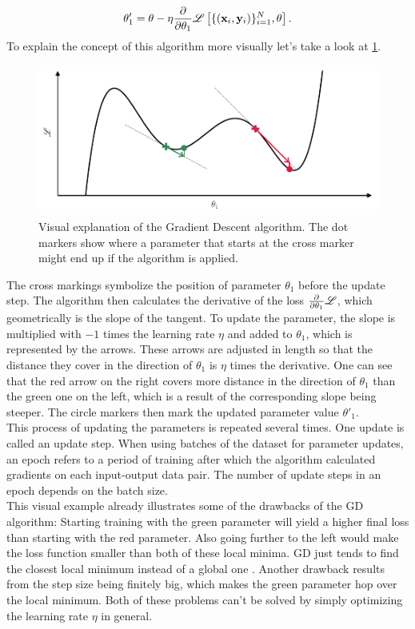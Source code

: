 \begin{equation}
	\theta_1' = \theta - \eta \frac{\partial}{\partial\theta_1} \mathscr{L}\left[ \{(\mathbf{x}_i, \mathbf{y}_i)\}_{i=1}^{N}, \theta \right].
\end{equation}
To explain the concept of this algorithm more visually let's take a look at \cref{fig:gd_explanation_plot}. 
\begin{figure}
	\centering
	\includegraphics[width = \textwidth]{text/MachineLearningBasics/plots/sgd_plot.pdf}
	\caption{Visual explanation of the Gradient Descent algorithm. The dot markers show where a parameter that starts at the cross marker might end up if the algorithm is applied.}
	\label{fig:gd_explanation_plot}
\end{figure}
The cross markings symbolize the position of parameter $\theta_1$ before the update step. The algorithm then calculates the derivative of the loss $\frac{\partial}{\partial\theta_1} \mathscr{L}$, which geometrically is the slope of the tangent. To update the parameter, the slope is multiplied with $-1$ times the learning rate $\eta$ and added to $\theta_1$, which is represented by the arrows. These arrows are adjusted in length so that the distance they cover in the direction of $\theta_1$ is $\eta$ times the derivative. One can see that the red arrow on the right covers more distance in the direction of $\theta_1$ than the green one on the left, which is a result of the corresponding slope being steeper. The circle markers then mark the updated parameter value $\theta'_1$.\\
This process of updating the parameters is repeated several times. One update is called an update step. When using batches of the dataset for parameter updates, an epoch refers to a period of training after which the algorithm calculated gradients on each input-output data pair. The number of update steps in an epoch depends on the batch size.\\ 
This visual example already illustrates some of the drawbacks of the GD algorithm: Starting training with the green parameter will yield a higher final loss than starting with the red parameter. Also going further to the left would make the loss function smaller than both of these local minima. GD just tends to find the closest local minimum instead of a global one \cite{SGDLocalMinima}. Another drawback results from the step size being finitely big, which makes the green parameter hop over the local minimum. Both of these problems can't be solved by simply optimizing the learning rate $\eta$ in general.


